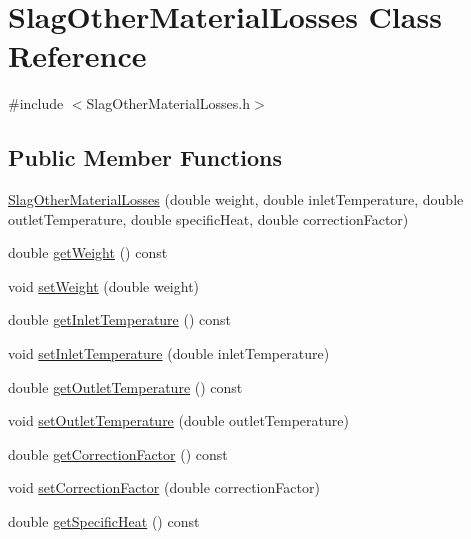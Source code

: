 \hypertarget{class_slag_other_material_losses}{}\section{Slag\+Other\+Material\+Losses Class Reference}
\label{class_slag_other_material_losses}


{\ttfamily \#include $<$Slag\+Other\+Material\+Losses.\+h$>$}

\subsection*{Public Member Functions}
\begin{DoxyCompactItemize}
\item 
\hyperlink{class_slag_other_material_losses_a8b09bf5dd916a6c7df45b5bf2849e6b8}{Slag\+Other\+Material\+Losses} (double weight, double inlet\+Temperature, double outlet\+Temperature, double specific\+Heat, double correction\+Factor)
\item 
double \hyperlink{class_slag_other_material_losses_a9b62b86eb4ec919d70dd8899ef5d3513}{get\+Weight} () const
\item 
void \hyperlink{class_slag_other_material_losses_a230a178f2ead59cd498b620e4bb4910f}{set\+Weight} (double weight)
\item 
double \hyperlink{class_slag_other_material_losses_aebd0f1b7d6c4bf0deb8ce8a86c5a80a7}{get\+Inlet\+Temperature} () const
\item 
void \hyperlink{class_slag_other_material_losses_a47bb0a61de501e3e9b7bd2bf2651eb8c}{set\+Inlet\+Temperature} (double inlet\+Temperature)
\item 
double \hyperlink{class_slag_other_material_losses_a1c48f1a70aaf030451b7e350f3d6cd18}{get\+Outlet\+Temperature} () const
\item 
void \hyperlink{class_slag_other_material_losses_afae6aafff94d02926135fabf20a87070}{set\+Outlet\+Temperature} (double outlet\+Temperature)
\item 
double \hyperlink{class_slag_other_material_losses_a920bbc2da2ba90416e86573830eee2cb}{get\+Correction\+Factor} () const
\item 
void \hyperlink{class_slag_other_material_losses_a2aa985511888327bed6039da79c8958a}{set\+Correction\+Factor} (double correction\+Factor)
\item 
double \hyperlink{class_slag_other_material_losses_aa68e92bdf836a4112c55344f897f2649}{get\+Specific\+Heat} () const
\item 

\end{DoxyCompactItemize}
